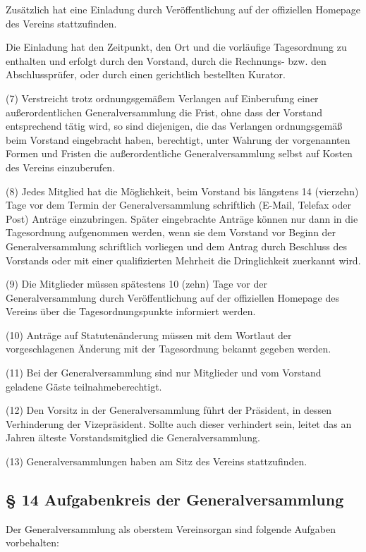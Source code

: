 \documentclass[11pt,a4paper]{article}
\begin{document}
Zusätzlich hat eine Einladung durch Veröffentlichung auf der offiziellen Homepage des Vereins stattzufinden.

Die Einladung hat den Zeitpunkt, den Ort und die vorläufige Tagesordnung zu enthalten und erfolgt durch den Vorstand, durch die Rechnungs- bzw. den Abschlussprüfer, oder durch einen gerichtlich bestellten Kurator.

(7)
Verstreicht trotz ordnungsgemäßem Verlangen auf Einberufung einer außerordentlichen Generalversammlung die Frist, ohne dass der Vorstand entsprechend tätig wird, so sind diejenigen, die das Verlangen ordnungsgemäß beim Vorstand eingebracht haben, berechtigt, unter Wahrung der vorgenannten Formen und Fristen die außerordentliche Generalversammlung selbst auf Kosten des Vereins einzuberufen.

(8)
Jedes Mitglied hat die Möglichkeit, beim Vorstand bis längstens 14 (vierzehn) Tage vor dem Termin der Generalversammlung schriftlich (E-Mail, Telefax oder Post) Anträge einzubringen.
Später eingebrachte Anträge können nur dann in die Tagesordnung aufgenommen werden, wenn sie dem Vorstand vor Beginn der Generalversammlung schriftlich vorliegen und dem Antrag durch Beschluss des Vorstands oder mit einer qualifizierten Mehrheit die Dringlichkeit zuerkannt wird.

(9)
Die Mitglieder müssen spätestens 10 (zehn) Tage vor der Generalversammlung durch Veröffentlichung auf der offiziellen Homepage des Vereins über die Tagesordnungspunkte informiert werden.

(10)
Anträge auf Statutenänderung müssen mit dem Wortlaut der vorgeschlagenen Änderung mit der Tagesordnung bekannt gegeben werden.

(11)
Bei der Generalversammlung sind nur Mitglieder und vom Vorstand geladene Gäste teilnahmeberechtigt.

(12)
Den Vorsitz in der Generalversammlung führt der Präsident, in dessen Verhinderung der Vizepräsident.
Sollte auch dieser verhindert sein, leitet das an Jahren älteste Vorstandsmitglied die Generalversammlung.

(13)
Generalversammlungen haben am Sitz des Vereins stattzufinden.

\subsection{§ 14
Aufgabenkreis der Generalversammlung}

Der Generalversammlung als oberstem Vereinsorgan sind folgende Aufgaben vorbehalten:
\end{document}
